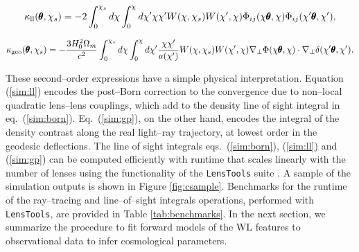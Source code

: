\documentclass[reprint,aps,prd,superscriptaddress,showkeys,showpacs]{revtex4-1}
\newcommand{\ttt}[1]{\texttt{#1}}
\newcommand\pt{\pmb{\theta}}
\begin{document}
\begin{widetext}

\begin{equation}
\label{sim:ll}
\kappa_{\rm ll}(\pt,\chi_s) = -2\int_0^{\chi_s}d\chi\int_0^\chi d\chi' \chi\chi' W(\chi,\chi_s)W(\chi',\chi)\Phi_{ij}(\chi\pt,\chi)\Phi_{ij}(\chi'\pt,\chi'),
\end{equation}

\begin{equation}
\label{sim:gp}
\kappa_{\rm geo}(\pt,\chi_s) = -\frac{3H_0^2\Omega_m}{c^2}\int_0^{\chi_s}d\chi\int_0^\chi d\chi' \frac{\chi\chi'}{a(\chi')} W(\chi,\chi_s)W(\chi',\chi)\nabla_\perp\Phi(\chi\pt,\chi)\cdot\nabla_\perp\delta(\chi'\pt,\chi').
\end{equation}

\end{widetext}
%
These second--order expressions have a simple physical interpretation. Equation (\ref{sim:ll}) encodes the post--Born correction to the convergence due to non--local quadratic lens--lens couplings, which add to the density line of sight integral in eq.~(\ref{sim:born}). Eq.~(\ref{sim:gp}), on the other hand, encodes the integral of the density contrast along the real light--ray trajectory, at lowest order in the geodesic deflections. The line of sight integrals eqs.~(\ref{sim:born}), (\ref{sim:ll}) and (\ref{sim:gp}) can be computed efficiently with runtime that scales linearly with the number of lenses using the functionality of the \ttt{LensTools} suite \citep{LensTools-paper}. A sample of the simulation outputs is shown in Figure \ref{fig:csample}. Benchmarks for the runtime of the ray--tracing and line--of--sight integrals operations, performed with \ttt{LensTools}, are provided in Table \ref{tab:benchmarks}. In the next section, we summarize the procedure to fit forward models of the WL features to observational data to infer cosmological parameters.
\end{document}
